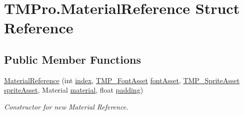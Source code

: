 \hypertarget{struct_t_m_pro_1_1_material_reference}{}\section{T\+M\+Pro.\+Material\+Reference Struct Reference}
\label{struct_t_m_pro_1_1_material_reference}
\subsection*{Public Member Functions}
\begin{DoxyCompactItemize}
\item 
\mbox{\hyperlink{struct_t_m_pro_1_1_material_reference_a5af83438b727dbb8cf9c49b02fdc2fda}{Material\+Reference}} (int \mbox{\hyperlink{struct_t_m_pro_1_1_material_reference_af0e1e670567aeaa6b1b1bc67b41d4d3d}{index}}, \mbox{\hyperlink{class_t_m_pro_1_1_t_m_p___font_asset}{T\+M\+P\+\_\+\+Font\+Asset}} \mbox{\hyperlink{struct_t_m_pro_1_1_material_reference_a57d6038454b7627a678c178751ae7b2e}{font\+Asset}}, \mbox{\hyperlink{class_t_m_pro_1_1_t_m_p___sprite_asset}{T\+M\+P\+\_\+\+Sprite\+Asset}} \mbox{\hyperlink{struct_t_m_pro_1_1_material_reference_a1ebf5e832a0bc9cab36327cc0208362e}{sprite\+Asset}}, Material \mbox{\hyperlink{struct_t_m_pro_1_1_material_reference_ab5f2e88a52f52cea5eb3f62ff9d452ef}{material}}, float \mbox{\hyperlink{struct_t_m_pro_1_1_material_reference_ab1a087e354c66d5ab731cba0beb4ad9a}{padding}})
\begin{DoxyCompactList}\small\item\em Constructor for new Material Reference. \end{DoxyCompactList}\end{DoxyCompactItemize}

